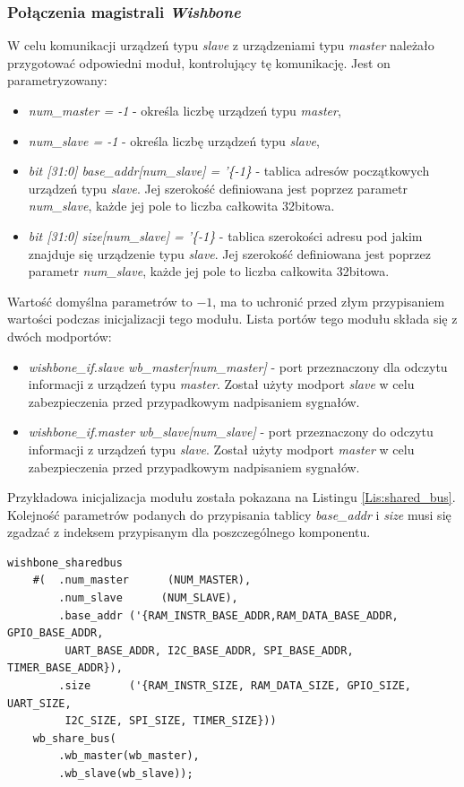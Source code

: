 \documentclass[11pt,a4paper]{article}
\begin{document}
		\subsubsection{Połączenia magistrali \textit{Wishbone}}
		\hspace{5mm}
		W celu komunikacji urządzeń typu \textit{slave} z urządzeniami typu \textit{master} należało przygotować odpowiedni moduł, kontrolujący tę komunikację. Jest on parametryzowany:
		\begin{itemize}
		\item \textit{num\_master = -1} - określa liczbę urządzeń typu \textit{master},
		\item \textit{num\_slave = -1} - określa liczbę urządzeń typu \textit{slave},
		\item \textit{bit [31:0] base\_addr[num\_slave] = '\{-1\}} - tablica adresów początkowych urządzeń typu \textit{slave}. Jej szerokość definiowana jest poprzez parametr \textit{num\_slave}, każde jej pole to liczba całkowita 32bitowa.
		\item \textit{bit [31:0] size[num\_slave] = '\{-1\} } - tablica szerokości adresu pod jakim znajduje się urządzenie typu \textit{slave}. Jej szerokość definiowana jest poprzez parametr \textit{num\_slave}, każde jej pole to liczba całkowita 32bitowa.
		\end{itemize}		 
		Wartość domyślna parametrów to $-1$, ma to uchronić przed złym przypisaniem wartości podczas inicjalizacji tego modułu. Lista portów tego modułu składa się z dwóch modportów:
		\begin{itemize}
			\item \textit{wishbone\_if.slave wb\_master[num\_master]} - port przeznaczony dla odczytu informacji z urządzeń typu \textit{master}. Został użyty modport \textit{slave} w celu zabezpieczenia przed przypadkowym nadpisaniem sygnałów.
			\item \textit{wishbone\_if.master wb\_slave[num\_slave]} - port przeznaczony do odczytu informacji z urządzeń typu \textit{slave}. Został użyty modport \textit{master} w celu zabezpieczenia przed przypadkowym nadpisaniem sygnałów.
		\end{itemize}
		Przykładowa inicjalizacja modułu została pokazana na Listingu \ref{Lis:shared_bus}. Kolejność parametrów podanych do przypisania tablicy \textit{base\_addr} i \textit{size} musi się zgadzać z indeksem przypisanym dla poszczególnego komponentu. \\
		\begin{minipage}{\textwidth}
\begin{scriptsize}
\begin{lstlisting}[label=Lis:shared_bus,caption=Przykładowa inicjalizacja modułu \textit{wishbone\_sharedbus}]
	wishbone_sharedbus
	#(	.num_master      (NUM_MASTER),
		.num_slave      (NUM_SLAVE),
		.base_addr ('{RAM_INSTR_BASE_ADDR,RAM_DATA_BASE_ADDR, GPIO_BASE_ADDR,
		 UART_BASE_ADDR, I2C_BASE_ADDR, SPI_BASE_ADDR, TIMER_BASE_ADDR}),
		.size      ('{RAM_INSTR_SIZE, RAM_DATA_SIZE, GPIO_SIZE, UART_SIZE,
		 I2C_SIZE, SPI_SIZE, TIMER_SIZE}))       
	wb_share_bus(
		.wb_master(wb_master),
		.wb_slave(wb_slave));
\end{lstlisting}
\end{scriptsize}
\end{minipage}
\end{document}
